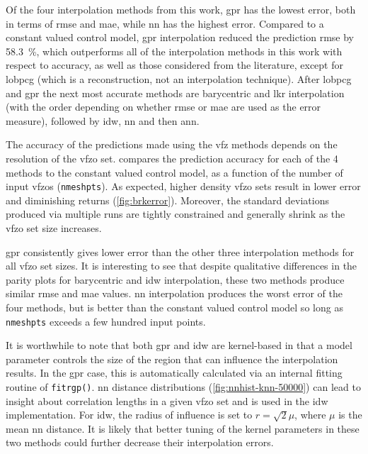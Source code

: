 \documentclass[final,twocolumn,12pt]{elsarticle}
\newcommand{\inpt}{input}
\newcommand{\inptvar}{nmeshpts}
\begin{document}
Of the four interpolation methods from this work, \Gls{gpr} has the lowest error, both in terms of \gls{rmse} and \gls{mae}, while \gls{nn} has the highest error. Compared to a constant valued control model, \gls{gpr} interpolation reduced the prediction \gls{rmse} by \SI{58.3}{\percent}, which outperforms all of the interpolation methods in this work with respect to accuracy, as well as those considered from the literature, except for \gls{lobpcg} (which is a reconstruction, not an interpolation technique). After \gls{lobpcg} and \gls{gpr} the next most accurate methods are barycentric and \gls{lkr} interpolation (with the order depending on whether \gls{rmse} or \gls{mae} are used as the error measure), followed by \gls{idw}, \gls{nn} and then \gls{ann}.

The accuracy of the predictions made using the \gls{vfz} methods depends on the resolution of the \gls{vfzo} set.  compares the prediction accuracy for each of the 4 methods to the constant valued control model, as a function of the number of \inpt{} \glspl{vfzo} (\texttt{\inptvar{}}). As expected, higher density \gls{vfzo} sets result in lower error and diminishing returns (\cref{fig:brkerror}). Moreover, the standard deviations produced via multiple runs are tightly constrained and generally shrink as the \gls{vfzo} set size increases. 

\Gls{gpr} consistently gives lower error than the other three interpolation methods for all \gls{vfzo} set sizes. It is interesting to see that despite qualitative differences in the parity plots for barycentric and \gls{idw} interpolation, these two methods produce similar \gls{rmse} and \gls{mae} values. \Gls{nn} interpolation produces the worst error of the four methods, but is better than the constant valued control model so long as \texttt{\inptvar{}} exceeds a few hundred \inpt{} points. 

It is worthwhile to note that both \gls{gpr} and \gls{idw} are kernel-based in that a model parameter controls the size of the region that can influence the interpolation results. In the \gls{gpr} case, this is automatically calculated via an internal fitting routine of \texttt{fitrgp()}. \gls{nn} distance distributions (\cref{fig:nnhist-knn-50000}) can lead to insight about correlation lengths in a given \gls{vfzo} set and is used in the \gls{idw} implementation. For \gls{idw}, the radius of influence is set to $r=\sqrt{2} \mu$, where $\mu$ is the mean \gls{nn} distance. It is likely that better tuning of the kernel parameters in these two methods could further decrease their interpolation errors.
\end{document}
